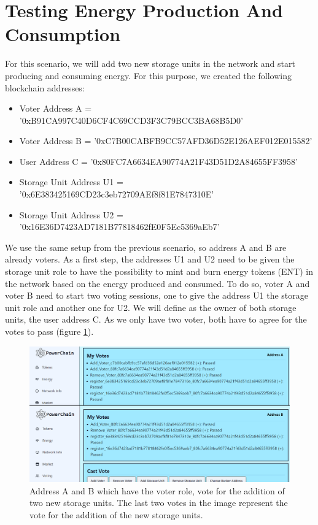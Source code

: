 \section{Testing Energy Production And Consumption}
For this scenario, we will add two new storage units in the network and start producing and consuming energy.
For this purpose, we created the following blockchain addresses:
\begin{itemize}
    \item Voter Address A = '0xB91CA997C40D6CF4C69CCD3F3C79BCC3BA68B5D0'
    \item Voter Address B = '0xC7B00CABFB9CC57AFD36D52E126AEF012E015582'
    \item User Address C = '0x80FC7A6634EA90774A21F43D51D2A84655FF3958'
    \item Storage Unit Address U1 = '0x6E383425169CD23c3eb72709AEf8f81E7847310E'
    \item Storage Unit Address U2 = '0x16E36D7423AD7181B77818462fE0F5Ec5369aEb7'
\end{itemize}
We use the same setup from the previous scenario, so address A and B are already voters. As a first step, the addresses U1 and U2 need to be given the storage unit role to have the possibility to mint and burn
energy tokens (ENT) in the network based on the energy produced and consumed. To do so, voter A and voter B need to start two voting
sessions, one to give the address U1 the storage unit role and another one for U2. We will define as the owner of both storage units, the
user address C. As we only have two voter, both have to agree for the votes to pass (figure \ref{fig:add_units}).\\
\begin{figure}[h!]
    \centering
    \includegraphics[width=\linewidth,frame,scale=1]{Figures/add_units.png}
    \caption{Address A and B which have the voter role, vote for the addition of two new storage units. The last two votes in the image represent the vote for the addition of the new storage units.}
    \label{fig:add_units}
\end{figure}
